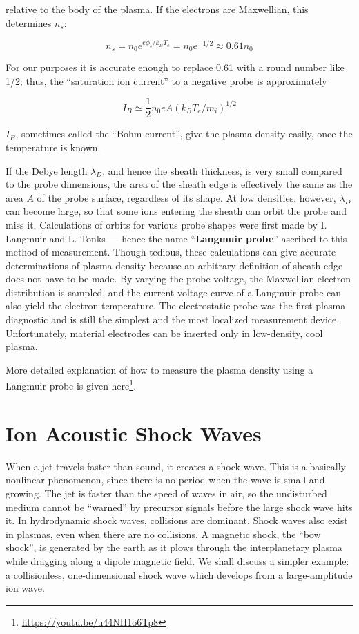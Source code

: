 \documentclass[
  notoc %
]{tufte-book}
\DeclareRobustCommand{\href}[2]{#2\footnote{\url{#1}}}
\begin{document}
relative to the body of the plasma. If the electrons are Maxwellian,
this determines \(n_s\):

\[
n_s = n_0 e^{e\phi_s/k_BT_e} = n_0 e^{-1/2} \approx 0.61 n_0
\]

For our purposes it is accurate enough to replace 0.61 with a round
number like 1/2; thus, the ``saturation ion current'' to a negative
probe is approximately

\[
I_B \simeq \frac{1}{2}n_0 e A (k_B T_e/m_i)^{1/2}
\]

\(I_B\), sometimes called the ``Bohm current'', give the plasma density
easily, once the temperature is known.

If the Debye length \(\lambda_D\), and hence the sheath thickness, is
very small compared to the probe dimensions, the area of the sheath edge
is effectively the same as the area \(A\) of the probe surface,
regardless of its shape. At low densities, however, \(\lambda_D\) can
become large, so that some ions entering the sheath can orbit the probe
and miss it. Calculations of orbits for various probe shapes were first
made by I. Langmuir and L. Tonks --- hence the name ``\textbf{Langmuir
probe}'' ascribed to this method of measurement. Though tedious, these
calculations can give accurate determinations of plasma density because
an arbitrary definition of sheath edge does not have to be made. By
varying the probe voltage, the Maxwellian electron distribution is
sampled, and the current-voltage curve of a Langmuir probe can also
yield the electron temperature. The electrostatic probe was the first
plasma diagnostic and is still the simplest and the most localized
measurement device. Unfortunately, material electrodes can be inserted
only in low-density, cool plasma.

More detailed explanation of how to measure the plasma density using a
Langmuir probe is given \href{https://youtu.be/u44NH1o6Tp8}{here}.

\hypertarget{ion-acoustic-shock-waves}{%
\section{Ion Acoustic Shock Waves}\label{ion-acoustic-shock-waves}}

When a jet travels faster than sound, it creates a shock wave. This is a
basically nonlinear phenomenon, since there is no period when the wave
is small and growing. The jet is faster than the speed of waves in air,
so the undisturbed medium cannot be ``warned'' by precursor signals
before the large shock wave hits it. In hydrodynamic shock waves,
collisions are dominant. Shock waves also exist in plasmas, even when
there are no collisions. A magnetic shock, the ``bow shock'', is
generated by the earth as it plows through the interplanetary plasma
while dragging along a dipole magnetic field. We shall discuss a simpler
example: a collisionless, one-dimensional shock wave which develops from
a large-amplitude ion wave.
\end{document}
